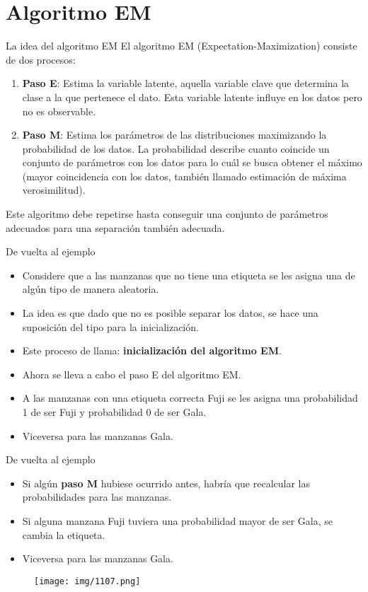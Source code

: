 \documentclass[11pt,aspectratio=169]{beamer}
\begin{document}
\section{Algoritmo EM}
\begin{frame}{La idea del algoritmo EM}
El algoritmo EM (Expectation-Maximization) consiste de dos procesos:\pause
\begin{enumerate}
	\item \textbf{Paso E}: Estima la variable latente, aquella variable clave que determina la clase a la que pertenece el dato. 
		Esta variable latente influye en los datos pero no es observable.\pause
	\item \textbf{Paso M}: Estima los parámetros de las distribuciones maximizando la probabilidad de los datos. La probabilidad
		describe cuanto coincide un conjunto de parámetros con los datos para lo cuál se busca obtener el máximo (mayor coincidencia
		con los datos, también llamado estimación de máxima verosimilitud).\pause
\end{enumerate}
Este algoritmo debe repetirse hasta conseguir una conjunto de parámetros adecuados para una separación también adecuada.
\end{frame}

\begin{frame}{De vuelta al ejemplo}
\begin{itemize}
	\item Considere que a las manzanas que no tiene una etiqueta se les asigna una de algún tipo de manera aleatoria.\pause
	\item La idea es que dado que no es posible separar los datos, se hace una suposición del tipo para la inicialización.\pause
	\item Este proceso de llama: \textbf{inicialización del algoritmo EM}.\pause
	\item Ahora se lleva a cabo el paso E del algoritmo EM.\pause
	\item A las manzanas con una etiqueta correcta Fuji se les asigna una probabilidad 1 de ser Fuji y probabilidad 0 de ser Gala.\pause
	\item Viceversa para las manzanas Gala.
\end{itemize}
\end{frame}

\begin{frame}{De vuelta al ejemplo}
\begin{itemize}
	\item Si algún \textbf{paso M} hubiese ocurrido antes, habría que recalcular las probabilidades para las manzanas.\pause
	\item Si alguna manzana Fuji tuviera una probabilidad mayor de ser Gala, se cambia la etiqueta.\pause
	\item Viceversa para las manzanas Gala.\pause
\end{itemize}
\begin{figure}[H]
	\centering
	\texttt{[image: img/1107.png]}
\end{figure}
\end{frame}
\end{document}
